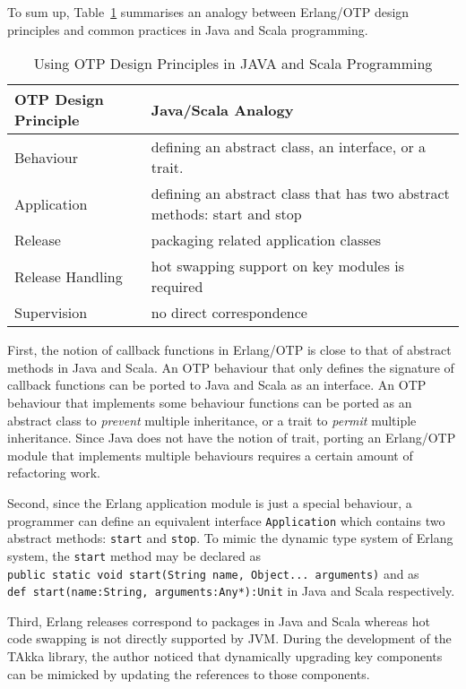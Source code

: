 To sum up, Table~\ref{otp} summarises an analogy between Erlang/OTP 
design principles and common practices in Java and Scala programming.  

\begin{table}[h]
\begin{tabular}{| l | p{10 cm} | }
\hline
  OTP Design Principle & Java/Scala Analogy \\
\hline
  Behaviour & defining an abstract class, an interface, or a trait. \\
\hline
  Application  & defining an abstract class that has two abstract methods: start 
and stop \\
\hline
  Release  & packaging related application classes  \\ 
\hline
  Release Handling  & hot swapping support on key modules is required \\
\hline
  Supervision  & no direct correspondence  \\
\hline
\end{tabular}
 \caption[]{Using OTP Design Principles in JAVA and Scala Programming}
\label{otp}
\end{table}

First, the notion of callback functions in Erlang/OTP is close to that
of abstract methods in Java and Scala.  An OTP behaviour that only defines the 
signature of callback functions can be ported to Java and Scala as an interface. 
 An OTP behaviour that implements some behaviour functions can be ported as an 
abstract class to {\it prevent} multiple inheritance, or a trait to {\it permit} 
multiple inheritance.  Since Java does not have the notion of trait, porting an 
Erlang/OTP module that implements multiple behaviours requires a certain amount 
of refactoring work.

Second, since the Erlang application module is just a special behaviour, a 
programmer can 
define an equivalent interface {\tt Application} which contains two abstract 
methods: {\tt start} and {\tt stop}.  To mimic the dynamic type system of Erlang 
system, the {\tt start} method may be declared as \\ 
{\tt public static void start(String name, Object... arguments)}
and as \\  
{\tt def start(name:String, arguments:Any*):Unit} in Java and Scala 
respectively. 

Third, Erlang releases correspond to  packages in Java and Scala whereas hot 
code swapping is not directly supported by JVM.  During the development of the 
TAkka library, the author noticed that dynamically upgrading key components can 
be mimicked by updating the references to those components.

